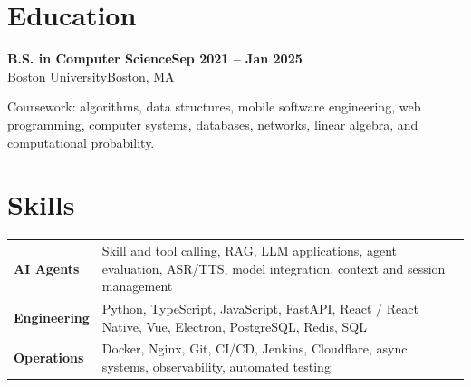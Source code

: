 \documentclass[10pt,letterpaper]{article}
\newcommand{\role}[4]{%
  \textbf{#1}\hfill\textbf{#2}\\[-1pt]
  \textcolor{muted}{#3}\hfill\textcolor{muted}{#4}\par
}
\begin{document}
\section{Education}
\role{B.S. in Computer Science}{Sep 2021 -- Jan 2025}{Boston University}{Boston, MA}
\textcolor{muted}{Coursework: algorithms, data structures, mobile software engineering, web programming, computer systems, databases, networks, linear algebra, and computational probability.}

\section{Skills}
\begin{tabularx}{\textwidth}{@{}>{\bfseries}p{1.35in}X@{}}
AI Agents & Skill and tool calling, RAG, LLM applications, agent evaluation, ASR/TTS, model integration, context and session management \\
Engineering & Python, TypeScript, JavaScript, FastAPI, React / React Native, Vue, Electron, PostgreSQL, Redis, SQL \\
Operations & Docker, Nginx, Git, CI/CD, Jenkins, Cloudflare, async systems, observability, automated testing
\end{tabularx}
\end{document}
